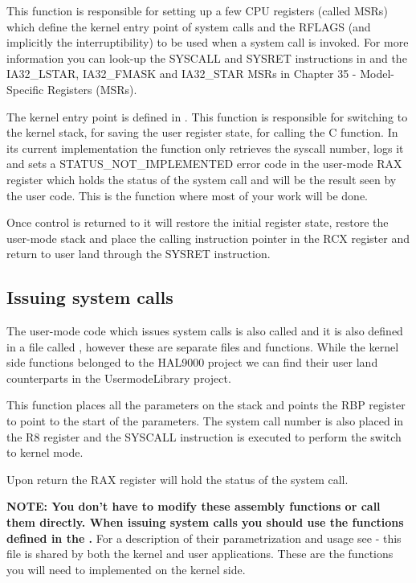 This function is responsible for setting up a few CPU registers (called MSRs) which define the kernel
entry point of system calls and the RFLAGS (and implicitly the interruptibility) to be used when a 
system call is invoked. For more information you can look-up the SYSCALL and SYSRET instructions in
\cite{intelInstr} and the IA32\_LSTAR, IA32\_FMASK and IA32\_STAR MSRs in \cite{intelSys} Chapter 35
 - Model-Specific Registers (MSRs).

The kernel entry point is  defined in . This function is 
responsible for switching to the kernel stack, for saving the user register state, for calling the C
  function. In its current implementation the function only retrieves the
syscall number, logs it and sets a STATUS\_NOT\_IMPLEMENTED error code in the user-mode RAX register
which holds the status of the system call and will be the result seen by the user code. This is the
function where most of your work will be done.

Once control is returned to  it will restore the initial register state, restore
the user-mode stack and place the calling instruction pointer in the RCX register and return to user
land through the SYSRET instruction.

\subsection{Issuing system calls}

The user-mode code which issues system calls is also called  and it is also
defined in a file called , however these are separate files and functions.
While the kernel side functions belonged to the HAL9000 project we can find their user land
counterparts in the UsermodeLibrary project.

This function places all the parameters on the stack and points the RBP register to point to the
start of the parameters. The system call number is also placed in the R8 register and the SYSCALL
instruction is executed to perform the switch to kernel mode.

Upon return the RAX register will hold the status of the system call.

\textbf{NOTE: You don't have to modify these assembly functions or call them directly. When issuing
system calls you should use the functions defined in the .} For a description
of their parametrization and usage see  - this file is shared by both the
kernel and user applications. These are the functions you will need to implemented on the kernel
side.

